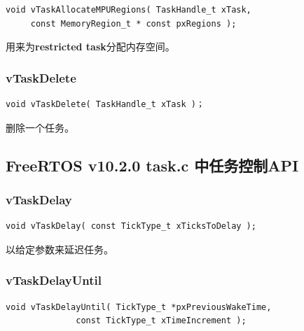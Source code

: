 \documentclass[12pt, a4paper]{article}
\begin{document}
\begin{lstlisting}[language={[ANSI]C},keywordstyle=\color{blue!70},commentstyle=\color{red!50!green!50!blue!50},frame=shadowbox, rulesepcolor=\color{red!20!green!20!blue!20}]
void vTaskAllocateMPURegions( TaskHandle_t xTask, 
	 const MemoryRegion_t * const pxRegions );
\end{lstlisting}

用来为\textbf{restricted task}分配内存空间。

\subsubsection {vTaskDelete}

\begin{lstlisting}[language={[ANSI]C},keywordstyle=\color{blue!70},commentstyle=\color{red!50!green!50!blue!50},frame=shadowbox, rulesepcolor=\color{red!20!green!20!blue!20}]
void vTaskDelete( TaskHandle_t xTask )；
\end{lstlisting}

删除一个任务。


\subsection {FreeRTOS v10.2.0 task.c 中任务控制API}

\subsubsection {vTaskDelay}

\begin{lstlisting}[language={[ANSI]C},keywordstyle=\color{blue!70},commentstyle=\color{red!50!green!50!blue!50},frame=shadowbox, rulesepcolor=\color{red!20!green!20!blue!20}]
void vTaskDelay( const TickType_t xTicksToDelay );
\end{lstlisting}

以给定参数来延迟任务。

\subsubsection {vTaskDelayUntil}

\begin{lstlisting}[language={[ANSI]C},keywordstyle=\color{blue!70},commentstyle=\color{red!50!green!50!blue!50},frame=shadowbox, rulesepcolor=\color{red!20!green!20!blue!20}]
void vTaskDelayUntil( TickType_t *pxPreviousWakeTime, 
		      const TickType_t xTimeIncrement );
\end{lstlisting}
\end{document}
